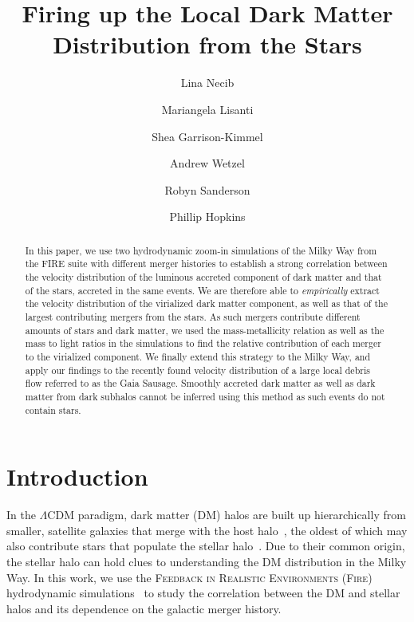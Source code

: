 \documentclass[twocolumn,preprintnumbers]{aastex6}
\begin{document}
\title{
Firing up the Local Dark Matter Distribution from the Stars
}

\author{Lina Necib}


\author{Mariangela Lisanti}

\author{Shea Garrison-Kimmel}
\author{Andrew Wetzel}
\author{Robyn Sanderson}
\author{Phillip Hopkins}

\begin{abstract}
In this paper, we use two hydrodynamic zoom-in simulations of the Milky Way from the FIRE suite with different merger histories to establish a strong correlation between the velocity distribution of the luminous accreted component of dark matter and that of the stars, accreted in the same events. We are therefore able to \emph{empirically} extract the velocity distribution of the virialized dark matter component, as well as that of the largest contributing mergers from the stars. As such mergers contribute different amounts of stars and dark matter,  we used the mass-metallicity relation as well as the mass to light ratios in the simulations to find the relative contribution of each merger to the virialized component. We finally extend this strategy to the Milky Way, and apply our findings to the recently found velocity distribution of a large local debris flow referred to as the Gaia Sausage. Smoothly accreted dark matter as well as dark matter from dark subhalos cannot be inferred using this method as such events do not contain stars.
\end{abstract}
\maketitle
\pagebreak

\section{Introduction} 
\label{sec:intro}

In the $\Lambda$CDM paradigm, dark matter (DM) halos are built up hierarchically from smaller, satellite galaxies that merge with the host halo~\citep{1978MNRAS.183..341W,Diemand:2008in,Springel:2008cc,2011ApJ...740..102K}, the oldest of which may also contribute stars that populate the stellar halo~\citep{Johnston:1995vd, Johnston:1996sb, Helmi:1999ks, Bullock:2000qf, Bullock:2005pi, Purcell:2007tr, DeLucia:2008gk}. Due to their common origin, the stellar halo can hold clues to understanding the DM distribution in the Milky Way.  In this work, we use the \textsc{Feedback in Realistic Environments (Fire)} hydrodynamic simulations~\citep{2014MNRAS.445..581H, 2017arXiv170206148H} to study the correlation between the DM and stellar halos and its dependence on the galactic merger history.
\end{document}
